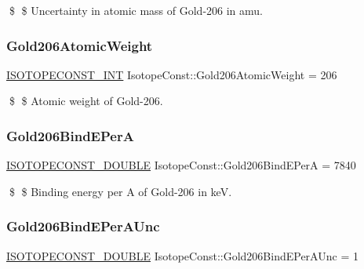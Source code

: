 \$ \$ Uncertainty in atomic mass of Gold-\/206 in amu. \mbox{\label{group___isotope_const-_gold-_au206_ga5974a8b2daffa0a444a306b5ebf6af54}} 
\subsubsection{\texorpdfstring{Gold206\+Atomic\+Weight}{Gold206AtomicWeight}}
{\footnotesize\ttfamily \mbox{\hyperlink{group___isotope_const-_macros_ga5f18360b3e99483a35c32d789e62621c}{I\+S\+O\+T\+O\+P\+E\+C\+O\+N\+S\+T\+\_\+\+I\+NT}} Isotope\+Const\+::\+Gold206\+Atomic\+Weight = 206}

\$ \$ Atomic weight of Gold-\/206. \mbox{\label{group___isotope_const-_gold-_au206_gace664983be40fb407f30b205c0a3a840}} 
\subsubsection{\texorpdfstring{Gold206\+Bind\+E\+PerA}{Gold206BindEPerA}}
{\footnotesize\ttfamily \mbox{\hyperlink{group___isotope_const-_macros_ga8f45a7272ce02c0b4c65c44636ed719a}{I\+S\+O\+T\+O\+P\+E\+C\+O\+N\+S\+T\+\_\+\+D\+O\+U\+B\+LE}} Isotope\+Const\+::\+Gold206\+Bind\+E\+PerA = 7840}

\$ \$ Binding energy per A of Gold-\/206 in keV. \mbox{\label{group___isotope_const-_gold-_au206_ga02b6ce346a30522d9a859fc96b7be411}} 
\subsubsection{\texorpdfstring{Gold206\+Bind\+E\+Per\+A\+Unc}{Gold206BindEPerAUnc}}
{\footnotesize\ttfamily \mbox{\hyperlink{group___isotope_const-_macros_ga8f45a7272ce02c0b4c65c44636ed719a}{I\+S\+O\+T\+O\+P\+E\+C\+O\+N\+S\+T\+\_\+\+D\+O\+U\+B\+LE}} Isotope\+Const\+::\+Gold206\+Bind\+E\+Per\+A\+Unc = 1}

